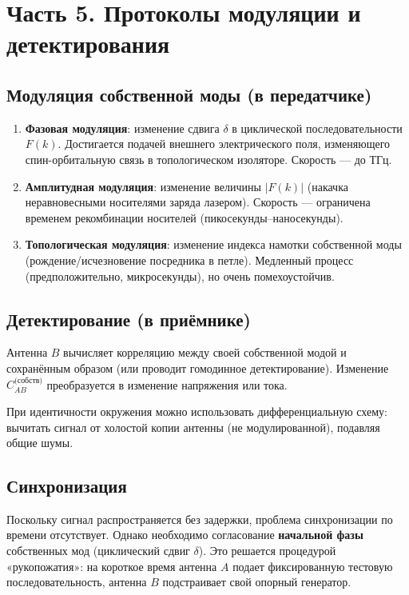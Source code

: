 \documentclass[a4paper,12pt]{article}
\begin{document}
\section*{Часть 5. Протоколы модуляции и детектирования}

\subsection{Модуляция собственной моды (в передатчике)}
\begin{enumerate}
    \item \textbf{Фазовая модуляция}: изменение сдвига \(\delta\) в циклической последовательности \(F(k)\). Достигается подачей внешнего электрического поля, изменяющего спин-орбитальную связь в топологическом изоляторе. Скорость — до ТГц.
    \item \textbf{Амплитудная модуляция}: изменение величины \(|F(k)|\) (накачка неравновесными носителями заряда лазером). Скорость — ограничена временем рекомбинации носителей (пикосекунды–наносекунды).
    \item \textbf{Топологическая модуляция}: изменение индекса намотки собственной моды (рождение/исчезновение посредника в петле). Медленный процесс (предположительно, микросекунды), но очень помехоустойчив.
\end{enumerate}

\subsection{Детектирование (в приёмнике)}
Антенна \(B\) вычисляет корреляцию между своей собственной модой и сохранённым образом (или проводит гомодинное детектирование). Изменение \(C_{AB}^{\text{(собств)}}\) преобразуется в изменение напряжения или тока.

При идентичности окружения можно использовать дифференциальную схему: вычитать сигнал от холостой копии антенны (не модулированной), подавляя общие шумы.

\subsection{Синхронизация}
Поскольку сигнал распространяется без задержки, проблема синхронизации по времени отсутствует. Однако необходимо согласование \textbf{начальной фазы} собственных мод (циклический сдвиг \(\delta\)). Это решается процедурой «рукопожатия»: на короткое время антенна \(A\) подает фиксированную тестовую последовательность, антенна \(B\) подстраивает свой опорный генератор.
\end{document}

